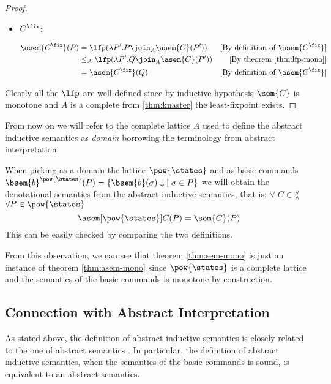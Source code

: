 \begin{proof}
\begin{itemize}
    \item $C^\fix$:

      \begin{align*}
        \asem{C^\fix}(P) 
          &= \lfp(\lambda P'. P \join_A \asem{C}(P'))
          &\text{[By definition of $\asem{C^\fix}$]}\\
          &\leq_A \lfp(\lambda P'. Q \join_A \asem{C}(P'))
          &\text{[By theorem \ref{thm:lfp-mono}]}\\
          &= \asem{C^\fix}(Q) 
          &\text{[By definition of $\asem{C^\fix}$]}\\
      \end{align*}
  \end{itemize}


  Clearly all the $\lfp$ are well-defined since by inductive hypothesis
  $\sem{C}$ is monotone and $A$ is a complete from 
  \ref{thm:knaster} the least-fixpoint exists.
\end{proof}

From now on we will refer to the complete lattice $A$ used to define the abstract
inductive semantics as \textit{domain} borrowing the terminology from abstract
interpretation.

\begin{observation}
  \label{obs:post}
  When picking as a domain the lattice $\pow{\states}$ and as basic commands
  $\bsem{b}^{\pow{\states}}(P) = \{ \bsem{b}(\sigma)\downarrow \; \mid \sigma 
  \in P \}$ we will obtain the denotational semantics from the 
  abstract inductive semantics, that is: $\forall \; C \in \lang$ $\forall P \in 
  \pow{\states}$ 
  $$\asem[\pow{\states}]{C}(P) = \sem{C}(P)$$
  This can be easily checked by comparing the two definitions.
\end{observation}

From this observation, we can see that theorem \ref{thm:sem-mono} is just an
instance of theorem \ref{thm:asem-mono} since $\pow{\states}$ is a
complete lattice and the semantics of the basic commands is monotone by
construction.

\subsection{Connection with Abstract Interpretation}

As stated above, the definition of abstract inductive semantics is closely
related to the one of abstract semantics \cite{Cousot77}. In particular, the 
definition of abstract inductive semantics, when the semantics of the basic
commands is sound, is equivalent to an abstract semantics.

